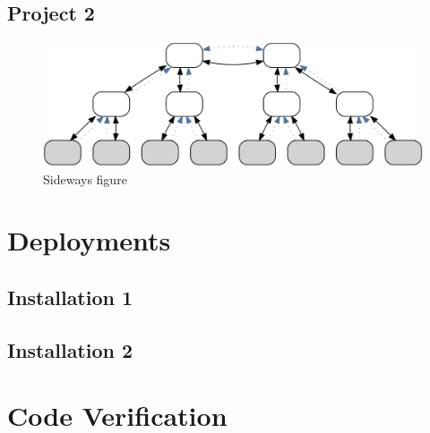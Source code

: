 \subsection{Project 2}



\begin{figure}[htbp]
    \centering
    \includegraphics[height=.5\textwidth,angle=270]{resources/images/example3}
    \caption{Sideways figure}\label{fig:eval:side}
\end{figure}



\section{Deployments}


\subsection{Installation 1}




\subsection{Installation 2}



\section{Code Verification}

